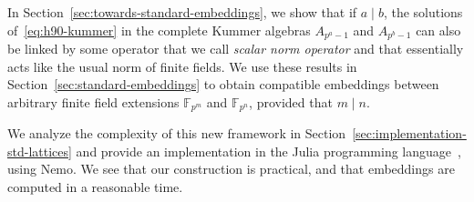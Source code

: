 In Section~\ref{sec:towards-standard-embeddings}, we show that if $a\mid b$, the solutions
of~\eqref{eq:h90-kummer} in the complete Kummer algebras $A_{p^a-1}$ and
$A_{p^b-1}$ can also be linked by some operator that we call \emph{scalar norm
operator} and that essentially acts like the usual norm of finite fields.
We use these results in Section~\ref{sec:standard-embeddings} to obtain
compatible embeddings between arbitrary finite field extensions
$\mathbb{F}_{p^m}$ and $\mathbb{F}_{p^n}$, provided that $m\mid n$.

We analyze the complexity of this new framework in
Section~\ref{sec:implementation-std-lattices} and provide an implementation in
the Julia programming language~\cite{Julia}, using Nemo. We see that our
construction is practical, and that embeddings are computed in a reasonable
time.
